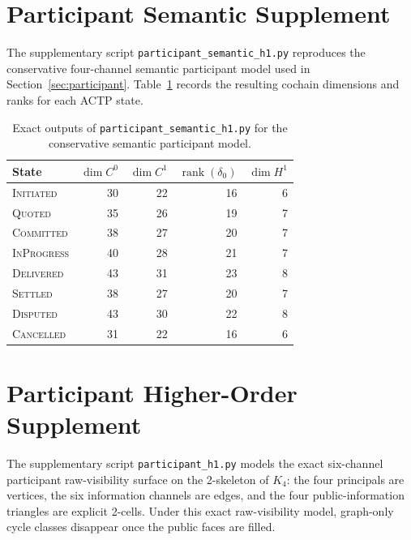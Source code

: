 \documentclass[11pt]{article}
\theoremstyle{plain}
\theoremstyle{definition}
\newcommand{\Czero}{C^{0}}
\newcommand{\Cone}{C^{1}}
\newcommand{\Hone}{H^{1}}
\newcommand{\deltazero}{\delta_{0}}
\newcommand{\rank}{\operatorname{rank}}
\newcommand{\dimn}{\operatorname{dim}}
\newcommand{\sINIT}{\textsc{Initiated}}
\newcommand{\sQUOT}{\textsc{Quoted}}
\newcommand{\sCOMM}{\textsc{Committed}}
\newcommand{\sINPROG}{\textsc{InProgress}}
\newcommand{\sDELIV}{\textsc{Delivered}}
\newcommand{\sSETTL}{\textsc{Settled}}
\newcommand{\sDISP}{\textsc{Disputed}}
\newcommand{\sCANC}{\textsc{Cancelled}}
\begin{document}
\section{Participant Semantic Supplement}
\label{app:participant_semantic}

{\sloppy
The supplementary script \texttt{participant\_semantic\_h1.py} reproduces the
conservative four-channel semantic participant model used in
Section~\ref{sec:participant}.  Table~\ref{tab:participant_semantic} records
the resulting cochain dimensions and ranks for each ACTP state.\par}

\begin{table}[h]
\centering
\caption{Exact outputs of \texttt{participant\_\allowbreak semantic\_\allowbreak h1.py} for the conservative semantic participant model.}
\label{tab:participant_semantic}
\begin{tabular}{@{}lrrrr@{}}
\toprule
\textbf{State} & $\dimn\Czero$ & $\dimn\Cone$ & $\rank(\deltazero)$ & $\dimn\Hone$ \\
\midrule
\sINIT   & 30 & 22 & 16 & 6 \\
\sQUOT   & 35 & 26 & 19 & 7 \\
\sCOMM   & 38 & 27 & 20 & 7 \\
\sINPROG & 40 & 28 & 21 & 7 \\
\sDELIV  & 43 & 31 & 23 & 8 \\
\sSETTL  & 38 & 27 & 20 & 7 \\
\sDISP   & 43 & 30 & 22 & 8 \\
\sCANC   & 31 & 22 & 16 & 6 \\
\bottomrule
\end{tabular}
\end{table}

\section{Participant Higher-Order Supplement}
\label{app:participant_higher}

The supplementary script \texttt{participant\_h1.py} models the exact
six-channel participant raw-visibility surface on the 2-skeleton of $K_4$:
the four principals are vertices, the six information channels are edges, and
the four public-information triangles are explicit 2-cells.  Under this exact
raw-visibility model, graph-only cycle classes disappear once the public faces
are filled.
\end{document}
